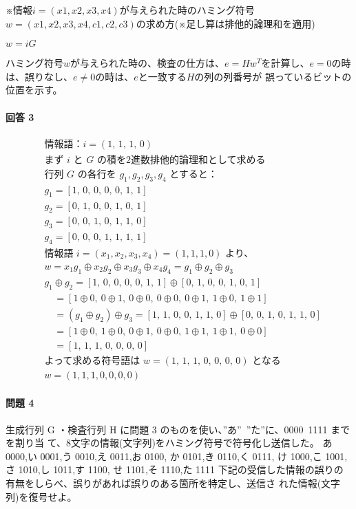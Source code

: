 \documentclass[dvipdfmx,titlepage,a4j]{jsarticle}
\begin{document}
※情報$i=(x1,x2,x3,x4)$が与えられた時のハミング符号$w=(x1,x2,x3,x4,c1,c2,c3)$の求め方(※足し算は排他的論理和を適用)

$w=iG$

ハミング符号$w$が与えられた時の、検査の仕方は、$e=Hw^T$を計算し、$e = 0$の時は、誤りなし、$e \neq 0$の時は、$e$と一致する$H$の列の列番号が
誤っているビットの位置を示す。

\paragraph{ 回答 3\\}
\[
\begin{aligned}
&\textbf{情報語：} i = (1,\,1,\,1,\,0) \\[6pt]
&\text{まず } i \text{ と } G \text{ の積を2進数排他的論理和として求める}\\[6pt]
&\text{行列 }G\text{ の各行を }g_1,g_2,g_3,g_4\text{ とすると：}\\
&g_1 = [1,\,0,\,0,\,0,\,0,\,1,\,1]\\
&g_2 = [0,\,1,\,0,\,0,\,1,\,0,\,1]\\
&g_3 = [0,\,0,\,1,\,0,\,1,\,1,\,0]\\
&g_4 = [0,\,0,\,0,\,1,\,1,\,1,\,1]\\[6pt]
&\text{情報語 } i=(x_1,x_2,x_3,x_4)=(1,1,1,0) \text{ より、}\\
&w = x_1g_1 \oplus x_2g_2 \oplus x_3g_3 \oplus x_4g_4 = g_1 \oplus g_2 \oplus g_3\\[6pt]
&g_1 \oplus g_2 = [1,\,0,\,0,\,0,\,0,\,1,\,1] \oplus [0,\,1,\,0,\,0,\,1,\,0,\,1]\\
&\quad = [1\oplus0,\ 0\oplus1,\ 0\oplus0,\ 0\oplus0,\ 0\oplus1,\ 1\oplus0,\ 1\oplus1]\\
&\quad =  (g_1 \oplus g_2) \oplus g_3 = [1,\,1,\,0,\,0,\,1,\,1,\,0] \oplus [0,\,0,\,1,\,0,\,1,\,1,\,0]\\
&\quad = [1\oplus0,\ 1\oplus0,\ 0\oplus1,\ 0\oplus0,\ 1\oplus1,\ 1\oplus1,\ 0\oplus0]\\
&\quad = [1,\,1,\,1,\,0,\,0,\,0,\,0]\\[6pt]
&\text{よって求める符号語は } w = (1,\,1,\,1,\,0,\,0,\,0,\,0) \text{ となる}\\[6pt]
&\boxed{w = (1,1,1,0,0,0,0)}
\end{aligned}
\]

\paragraph{ 問題 4\\}
生成行列 G ・検査行列 H に問題 3 のものを使い、”あ”~”た”に、0000~1111 までを割り当 て、8文字の情報(文字列)をハミング符号で符号化し送信した。
あ 0000,い 0001,う 0010,え 0011,お 0100, か 0101,き 0110,く 0111, け 1000,こ 1001,さ 1010,し 1011,す 1100, せ 1101,そ 1110,た 1111
下記の受信した情報の誤りの有無をしらべ、誤りがあれば誤りのある箇所を特定し、送信さ れた情報(文字列)を復号せよ。
\end{document}
